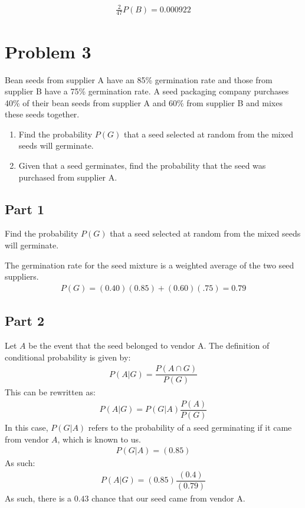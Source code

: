 \documentclass{article}
\begin{document}
\begin{align*}
\boxed{\frac{2}{47} P(B) = 0.000922}
\end{align*}
\clearpage
\section*{Problem 3}
Bean seeds from supplier A have an 85\% germination rate and those from supplier B have a 75\% germination rate. A seed packaging company purchases 40\% of their bean seeds from supplier A and 60\% from supplier B and mixes these seeds together.
\begin{enumerate}


\item
Find the probability $P(G)$ that a seed selected at random from the mixed seeds will germinate.
\item
Given that a seed germinates, find the probability that the seed was purchased from supplier A.
\end{enumerate}
\subsection*{Part 1}
Find the probability $P(G)$ that a seed selected at random from the mixed seeds will germinate.

The germination rate for the seed mixture is a weighted average of the two seed suppliers.
\begin{align*}
\boxed{P(G) = (0.40)(0.85) + (0.60)(.75) = 0.79}
\end{align*}
\subsection*{Part 2}
Let $A$ be the event that the seed belonged to vendor A.
The definition of conditional probability is given by:
\begin{align*}
P(A|G) = \dfrac{P(A\cap G)}{P(G)}
\end{align*}
This can be rewritten as:
\begin{align*}
P(A|G) = P(G|A)\dfrac{P(A)}{P(G)}
\end{align*}
In this case, $P(G|A)$ refers to the probability of a seed germinating if it came from vendor $A$, which is known to us. 
\begin{align*}
P(G|A) = (0.85)
\end{align*}
As such:
\begin{align*}
\boxed{P(A|G) = (0.85)\dfrac{(0.4)}{(0.79)}}
\end{align*}
As such, there is a $\boxed{0.43}$ chance that our seed came from vendor A.
\end{document}
